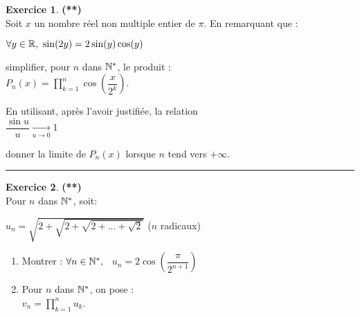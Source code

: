 \documentclass[a4paper,11pt]{article}
\theoremstyle{definition}
\newtheorem{exo}{Exercice} %
\begin{document}
\begin{minipage}[c]{1\linewidth}
\begin{minipage}[c]{0.48\linewidth}
		\begin{exo}\textbf{(**)}\quad\\[0.2cm]
			
			Soit $x$ un nombre réel non multiple
			entier de $\pi$. En remarquant que :\quad\\[0.25cm]
			
			\centering
			
			$\forall y\in\mathbb{R}, \ \sin(2y)= 2\sin(y)\cos(y)$\quad\\[0.25cm]
			
		
			
			\raggedright simplifier, pour $n$ dans $\mathbb{N}^*$, le produit :\quad\\[0.25cm]
			
			\centering$ P_n(x) = \displaystyle\prod\limits_{k=1}^{n}{\cos\left(\dfrac{x}{2^k}\right)}$.\quad\\[0.25cm]
			
			\raggedright En utilisant, après l’avoir justifiée, la relation \quad\\[0.25cm]
			
			\centering$ \dfrac{\sin u}{u} \underset{u \rightarrow 0}{\longrightarrow} 1$\quad\\[0.25cm]
			
			\raggedright donner la limite de $P_n(x)$ lorsque $n$ tend vers $+\infty$.
			
			\centering
			\rule{1\linewidth}{0.6pt}
		\end{exo}
		
		
		
		
		
		\begin{exo}\textbf{(**)}\quad\\[0.2cm]
			Pour $n$ dans $\mathbb{N}^*$, soit:\quad\\[0.25cm]
			
			\centering
			
			$u_n= \sqrt{2+\sqrt{2+\sqrt{2+...+\sqrt{2}}}}$ \quad ($n$ radicaux)\quad\\[0.25cm]
			
			\begin{enumerate}
				\item Montrer : \quad $\forall n\in\mathbb{N}^*,$ \ $u_n = 2\cos\left(\dfrac{\pi}{2^{n+1}}\right)$
				\item Pour $n$ dans $\mathbb{N}^*$, on pose :\quad\\[0.25cm]
				
				\centering$ v_n = \displaystyle\prod\limits_{k=1}^{n}{u_k}$.\quad\\[0.25cm]
				

\end{enumerate}
\end{exo}
\end{minipage}
\end{minipage}
\end{document}
